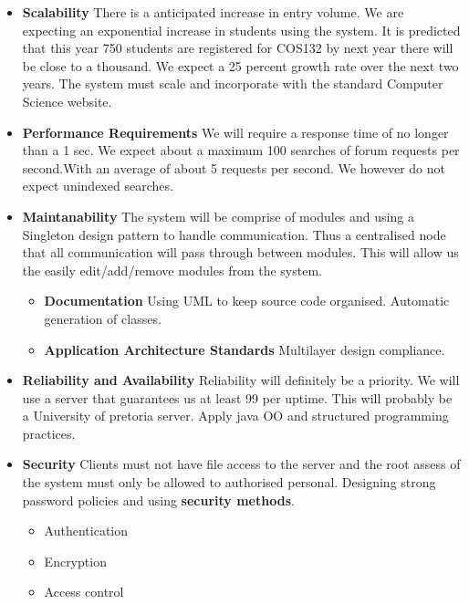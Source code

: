 
%

\begin{itemize}
	\item \textbf{Scalability}
		There is a anticipated increase in entry volume. We are expecting an exponential increase in students using the system. It is predicted that this year 750 students are registered for COS132 by next year there will be close to a thousand. We expect a 25 percent growth rate over the next two years. 			\cite{classRepMeeting}
		The system must scale and incorporate with the standard Computer Science website. 
	\item \textbf{Performance Requirements}
		We will require a response time of no longer than a 1 sec. We expect about a maximum 100 searches of forum requests per second.With an average of about 5 requests per second. We however do not expect unindexed searches.
	\item \textbf{Maintanability}
		The system will be comprise of modules and using a Singleton design pattern to handle communication. Thus a centralised node that all communication will pass through between modules. This will allow us the easily edit/add/remove modules from the system.
		\begin{itemize}
			\item \textbf{Documentation}
				Using UML to keep source code organised. Automatic generation of classes.
			\item \textbf{Application Architecture Standards}
				Multilayer design compliance.
		\end{itemize}
	\item \textbf{Reliability and Availability}
		Reliability will definitely be a priority. We will use a server that guarantees us at least 99 per uptime. This will probably be a University of pretoria server. Apply java OO and structured programming practices.
	\item \textbf{Security}
		Clients must not have file access to the server and the root assess of the system must only be allowed to authorised personal. Designing strong password policies and using \textbf{security methods}.
		\begin{itemize}
			\item Authentication
			\item Encryption
			\item Access control

\end{itemize}
\end{itemize}

